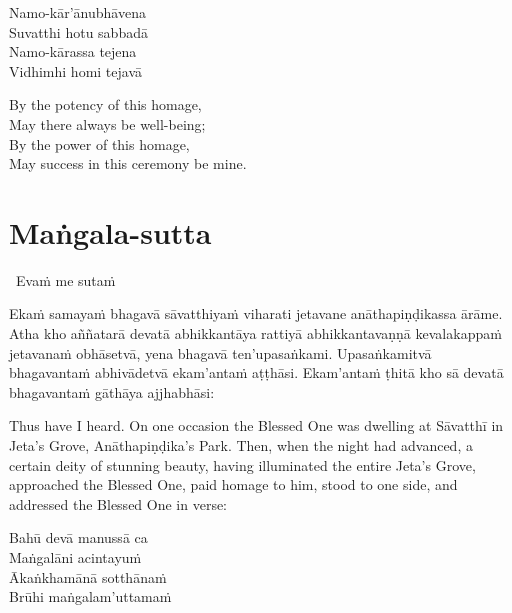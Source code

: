 \begin{pali-hang-continued}
  Namo-kār'ānubhāvena\\
  Suvatthi hotu sabbadā\\
  Namo-kārassa tejena\\
  Vidhimhi homi tejavā
\end{pali-hang-continued}

\begin{english-verses}
  By the potency of this homage,\\
  May there always be well-being;\\
  By the power of this homage,\\
  May success in this ceremony be mine.
\end{english-verses}

\suttaRef{[Thai]}

\section{Maṅgala-sutta}
\label{mangala-sutta}

\begin{pali-leader}
  \anglebracketleft\ \hspace{-0.5mm}Evaṁ me sutaṁ \hspace{-0.5mm}\anglebracketright\
\end{pali-leader}
\begin{pali-hangtogether}
  Ekaṁ samayaṁ bhagavā sāvatthiyaṁ viharati jetavane anāthapiṇḍikassa ārāme. Atha kho aññatarā devatā abhikkantāya rattiyā abhikkantavaṇṇā kevalakappaṁ jetavanaṁ obhāsetvā, yena bhagavā ten'upasaṅkami. Upasaṅkamitvā bhagavantaṁ abhivādetvā ekam'antaṁ aṭṭhāsi. Ekam'antaṁ ṭhitā kho sā devatā bhagavantaṁ gāthāya ajjhabhāsi:
\end{pali-hangtogether}

\begin{english-verses}
  Thus have I heard. On one occasion the Blessed One was dwelling at Sāvatthī in Jeta's Grove, Anāthapiṇḍika's Park. Then, when the night had advanced, a certain deity of stunning beauty, having illuminated the entire Jeta's Grove, approached the Blessed One, paid homage to him, stood to one side, and addressed the Blessed One in verse:
\end{english-verses}

\begin{pali-hang}
  Bahū devā manussā ca\\
  Maṅgalāni acintayuṁ\\
  Ākaṅkhamānā sotthānaṁ\\
  Brūhi maṅgalam'uttamaṁ
\end{pali-hang}

